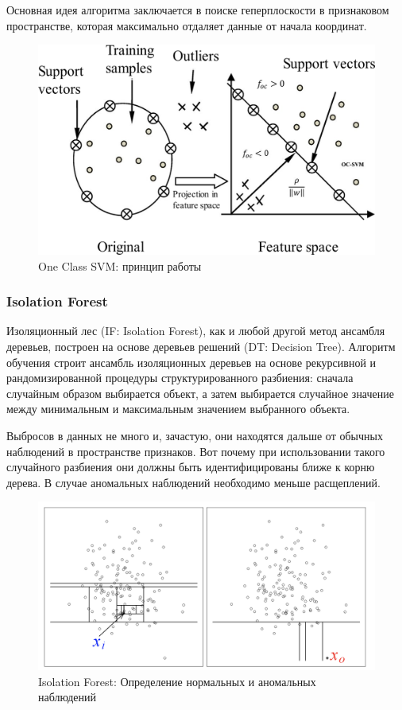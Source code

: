 \documentclass[12pt]{article}
\begin{document}
    \par Основная идея алгоритма заключается в поиске геперплоскости в признаковом пространстве, которая максимально отдаляет данные от начала координат.

    \begin{figure}[h!]
        \centering
        \includegraphics[width=0.8\linewidth]{OneClassSVM.png}
        \caption{One Class SVM: принцип работы}
        \label{sec:Research:Model:OneClassSVM:fig:OneClassSVM}
    \end{figure}


    \subsubsection{Isolation Forest}
    \label{sec:Research:Model:IsolationForest}

    \par Изоляционный лес (IF: Isolation Forest), как и любой другой метод ансамбля деревьев, построен на основе деревьев решений (DT: Decision Tree). Алгоритм обучения строит ансамбль изоляционных деревьев на основе рекурсивной и рандомизированной процедуры структурированного разбиения: сначала случайным образом выбирается объект, а затем выбирается случайное значение между минимальным и максимальным значением выбранного объекта.

    \par Выбросов в данных не много и, зачастую, они находятся дальше от обычных наблюдений в пространстве признаков. Вот почему при использовании такого случайного разбиения они должны быть идентифицированы ближе к корню дерева. В случае аномальных наблюдений необходимо меньше расщеплений.

    \begin{figure}[h!]
        \centering
        \includegraphics[width=0.8\linewidth]{IsolationForest.png}
        \caption{Isolation Forest: Определение нормальных и аномальных наблюдений}
        \label{sec:Research:Model:IsolationForest:fig:IsolationForest}
    \end{figure}
\end{document}
